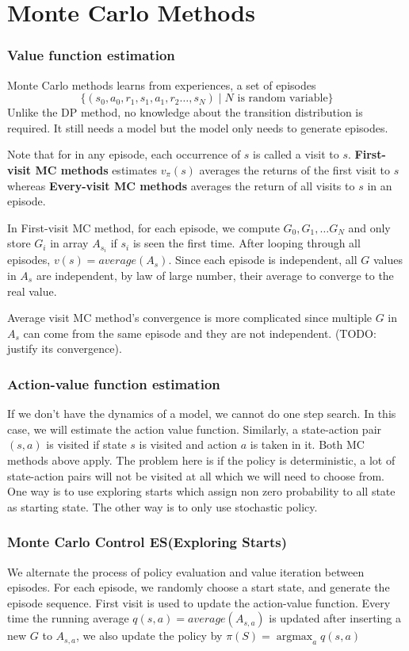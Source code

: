 \documentclass[twocolumn, 10pt]{article}
\DeclareMathOperator*{\argmax}{argmax}
\begin{document}
 \section{Monte Carlo Methods}
 \subsubsection*{Value function estimation}
 Monte Carlo methods learns from experiences, a set of episodes 
 $$\{(s_0, a_0, r_1,  s_1, a_1, r_2 \ldots, s_N) \mid N \mbox{ is random variable} \}$$ 
 Unlike the DP method, no knowledge about the transition distribution is required. It still needs a model but the model only needs to generate episodes. 
 
 Note that for in any episode, each occurrence of $s$ is called a visit to $s$. \textbf{First-visit MC methods} estimates $v_{\pi}(s)$ averages the returns of the first visit to $s$ whereas \textbf{Every-visit MC methods} averages the return of all visits to $s$ in an episode. 
 
 In First-visit MC method, for each episode, we compute $G_0, G_1, \ldots G_N$ and only store $G_i$ in array $A_{s_i}$ if $s_i$ is seen the first time. After looping through all episodes, $v(s) = average(A_{s})$. Since each episode is independent, all $G$ values in $A_{s}$ are independent, by law of large number, their average to converge to the real value.
 
 Average visit MC method's convergence is more complicated since multiple $G$ in $A_{s}$ can come from the same episode and they are not independent. (TODO: justify its convergence).
 
 \subsubsection*{Action-value function estimation}
 If we don't have the dynamics of a model, we cannot do one step search. In this case, we will estimate the action value function. Similarly, a state-action pair $(s,a)$ is visited if state $s$ is visited and action $a$ is taken in it. Both MC methods above apply. The problem here is if the policy is deterministic, a lot of state-action pairs will not be visited at all which we will need to choose from. One way is to use exploring starts which assign non zero probability to all state as starting state. The other way is to only use stochastic policy.

\subsubsection*{Monte Carlo Control ES(Exploring Starts)}
We alternate the process of policy evaluation and value iteration between episodes. For each episode, we randomly choose a start state, and generate the episode sequence. First visit is used to update the action-value function. Every time the running average $q(s, a) = average(A_{s,a})$ is updated after inserting a new $G$ to $A_{s,a}$, we also update the policy by $ \pi(S) = \argmax_{a} q(s, a)$
\end{document}
